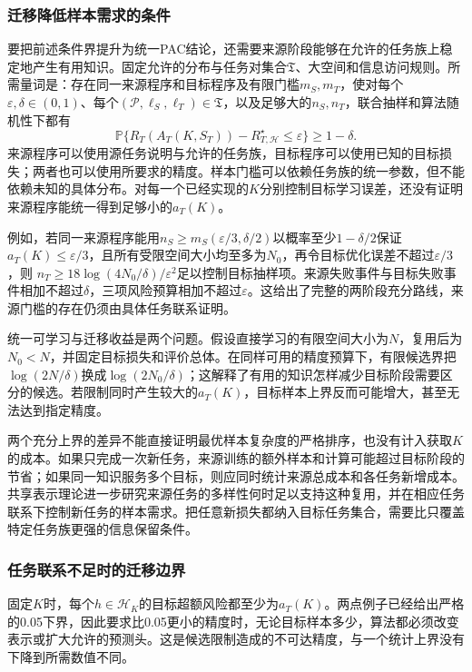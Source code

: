 \subsubsection{迁移降低样本需求的条件}

要把前述条件界提升为统一PAC结论，还需要来源阶段能够在允许的任务族上稳定地产生有用知识。固定允许的分布与任务对集合$\mathfrak T$、大空间和信息访问规则。所需量词是：存在同一来源程序和目标程序及有限门槛$m_S,m_T$，使对每个$\varepsilon,\delta\in(0,1)$、每个$(\mathcal P,\ell_S,\ell_T)\in\mathfrak T$，以及足够大的$n_S,n_T$，联合抽样和算法随机性下都有
\[
 \mathbb P\{R_T(A_T(K,S_T))-R_{T,\mathcal H}^{\star}\leq\varepsilon\}
 \geq1-\delta.
\]
来源程序可以使用源任务说明与允许的任务族，目标程序可以使用已知的目标损失；两者也可以使用所要求的精度。样本门槛可以依赖任务族的统一参数，但不能依赖未知的具体分布。对每一个已经实现的$K$分别控制目标学习误差，还没有证明来源程序能统一得到足够小的$a_T(K)$。

例如，若同一来源程序能用$n_S\geq m_S(\varepsilon/3,\delta/2)$以概率至少$1-\delta/2$保证$a_T(K)\leq\varepsilon/3$，且所有受限空间大小均至多为$N_0$，再令目标优化误差不超过$\varepsilon/3$，则
$n_T\geq18\log(4N_0/\delta)/\varepsilon^2$足以控制目标抽样项。来源失败事件与目标失败事件相加不超过$\delta$，三项风险预算相加不超过$\varepsilon$。这给出了完整的两阶段充分路线，来源门槛的存在仍须由具体任务联系证明。

统一可学习与迁移收益是两个问题。假设直接学习的有限空间大小为$N$，复用后为$N_0<N$，并固定目标损失和评价总体。在同样可用的精度预算下，有限候选界把$\log(2N/\delta)$换成$\log(2N_0/\delta)$；这解释了有用的知识怎样减少目标阶段需要区分的候选。若限制同时产生较大的$a_T(K)$，目标样本上界反而可能增大，甚至无法达到指定精度。

两个充分上界的差异不能直接证明最优样本复杂度的严格排序，也没有计入获取$K$的成本。如果只完成一次新任务，来源训练的额外样本和计算可能超过目标阶段的节省；如果同一知识服务多个目标，则应同时统计来源总成本和各任务新增成本。共享表示理论进一步研究来源任务的多样性何时足以支持这种复用，并在相应任务联系下控制新任务的样本需求。把任意新损失都纳入目标任务集合，需要比只覆盖特定任务族更强的信息保留条件。

\subsubsection{任务联系不足时的迁移边界}

固定$K$时，每个$h\in\mathcal H_K$的目标超额风险都至少为$a_T(K)$。两点例子已经给出严格的0.05下界，因此要求比0.05更小的精度时，无论目标样本多少，算法都必须改变表示或扩大允许的预测头。这是候选限制造成的不可达精度，与一个统计上界没有下降到所需数值不同。


